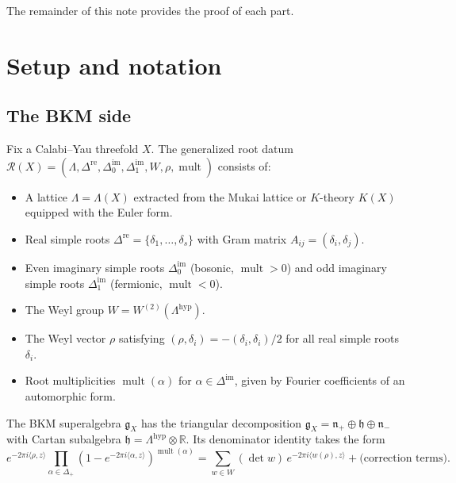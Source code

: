 \documentclass[11pt]{amsart}
\theoremstyle{definition}
\theoremstyle{remark}
\DeclareMathOperator{\mult}{mult}
\newcommand{\cR}{\mathcal{R}}
\newcommand{\fg}{\mathfrak{g}}
\newcommand{\fh}{\mathfrak{h}}
\newcommand{\fn}{\mathfrak{n}}
\begin{document}
The remainder of this note provides the proof of each part.

\section{Setup and notation}\label{sec:setup}

\subsection{The BKM side}

Fix a Calabi--Yau threefold $X$. The generalized root datum
$\cR(X) = (\Lambda, \Delta^{\mathrm{re}}, \Delta^{\mathrm{im}}_0,
\Delta^{\mathrm{im}}_1, W, \rho, \mult)$ consists of:
\begin{itemize}
 \item A lattice $\Lambda = \Lambda(X)$ extracted from the Mukai
 lattice or $K$-theory $K(X)$ equipped with the Euler form.
 \item Real simple roots
 $\Delta^{\mathrm{re}} = \{\delta_1, \ldots, \delta_s\}$
 with Gram matrix $A_{ij} = (\delta_i, \delta_j)$.
 \item Even imaginary simple roots $\Delta^{\mathrm{im}}_0$
 (bosonic, $\mult > 0$) and odd imaginary simple roots
 $\Delta^{\mathrm{im}}_1$ (fermionic, $\mult < 0$).
 \item The Weyl group $W = W^{(2)}(\Lambda^{\mathrm{hyp}})$.
 \item The Weyl vector $\rho$ satisfying
 $(\rho, \delta_i) = -(\delta_i, \delta_i)/2$ for all real
 simple roots $\delta_i$.
 \item Root multiplicities $\mult(\alpha)$ for
 $\alpha \in \Delta^{\mathrm{im}}$, given by Fourier
 coefficients of an automorphic form.
\end{itemize}

The BKM superalgebra $\fg_X$ has the triangular decomposition
$\fg_X = \fn_+ \oplus \fh \oplus \fn_-$ with Cartan subalgebra
$\fh = \Lambda^{\mathrm{hyp}} \otimes \mathbb{R}$. Its
denominator identity takes the form
\begin{equation}\label{eq:bkm-denom}
 e^{-2\pi i \langle \rho, z \rangle}
 \prod_{\alpha \in \Delta_+}
 (1 - e^{-2\pi i \langle \alpha, z \rangle})^{\mult(\alpha)}
 = \sum_{w \in W} (\det w)\, e^{-2\pi i \langle w(\rho), z \rangle}
 + \text{(correction terms)}.
\end{equation}
\end{document}
